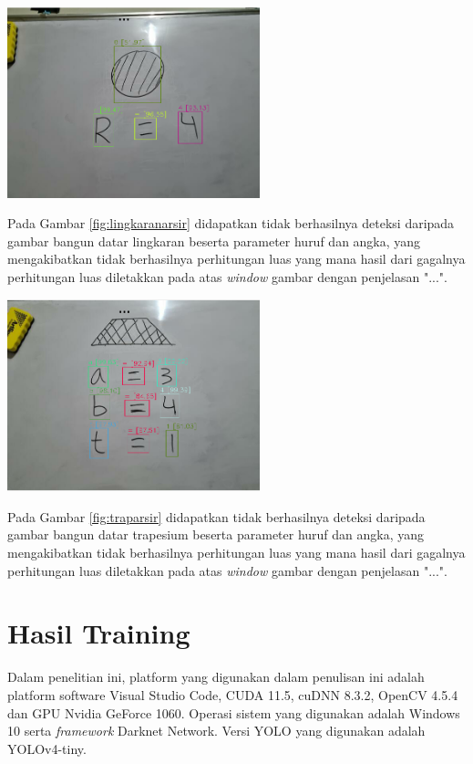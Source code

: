 \begin{center}
	\includegraphics[width=0.55\textwidth]{gambar/lingkaran arsir.png}
	\label{fig:lingkaranarsir}
\end{center}
Pada Gambar \ref{fig:lingkaranarsir} didapatkan tidak berhasilnya deteksi daripada gambar bangun datar lingkaran beserta parameter huruf dan angka, yang mengakibatkan tidak berhasilnya perhitungan luas yang mana hasil dari gagalnya perhitungan luas diletakkan pada atas \textit{window} gambar dengan penjelasan "...".

\begin{center}
	\includegraphics[width=0.55\textwidth]{gambar/trapesium arsir.png}
	\label{fig:traparsir}
\end{center}
Pada Gambar \ref{fig:traparsir} didapatkan tidak berhasilnya deteksi daripada gambar bangun datar trapesium beserta parameter huruf dan angka, yang mengakibatkan tidak berhasilnya perhitungan luas yang mana hasil dari gagalnya perhitungan luas diletakkan pada atas \textit{window} gambar dengan penjelasan "...".

\section{Hasil Training}
Dalam penelitian ini, platform yang digunakan dalam penulisan ini adalah platform software Visual Studio Code, CUDA 11.5, cuDNN 8.3.2, OpenCV 4.5.4 dan GPU Nvidia GeForce 1060. Operasi sistem yang digunakan adalah Windows 10 serta \textit{framework} Darknet Network. Versi YOLO yang digunakan adalah YOLOv4-tiny.

